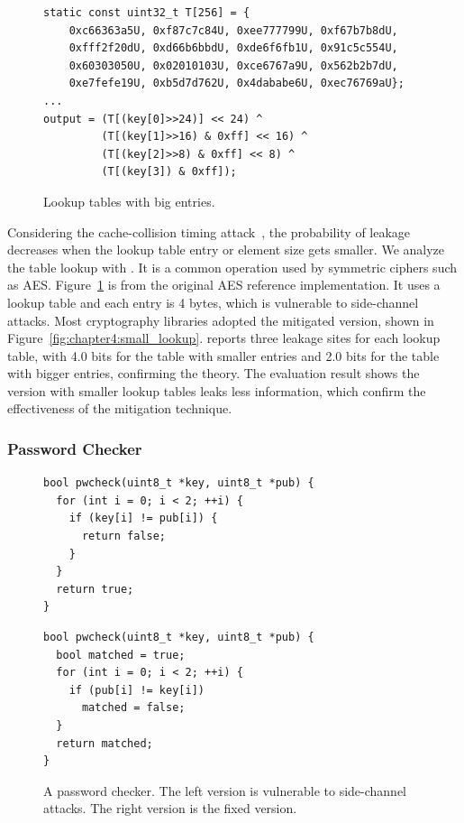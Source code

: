 \begin{figure}
\centering
    \begin{lstlisting}[xleftmargin=.1\textwidth, xrightmargin=.1\textwidth, frame=none]
static const uint32_t T[256] = {
    0xc66363a5U, 0xf87c7c84U, 0xee777799U, 0xf67b7b8dU,
    0xfff2f20dU, 0xd66b6bbdU, 0xde6f6fb1U, 0x91c5c554U,
    0x60303050U, 0x02010103U, 0xce6767a9U, 0x562b2b7dU,
    0xe7fefe19U, 0xb5d7d762U, 0x4dababe6U, 0xec76769aU};
...
output = (T[(key[0]>>24)] << 24) ^
         (T[(key[1]>>16) & 0xff] << 16) ^
         (T[(key[2]>>8) & 0xff] << 8) ^
         (T[(key[3]) & 0xff]);
\end{lstlisting}
  \caption{Lookup tables with big entries.}\label{fig:chapter4:big_lookup}
\end{figure}


Considering the cache-collision timing attack~\cite{Bonneau11894063_16}, the
probability of leakage decreases when the lookup table entry or element size gets
smaller. We analyze the table lookup with \tool{}. It is a common operation used by symmetric ciphers such as AES. Figure~\ref{fig:chapter4:big_lookup} is from the original AES reference implementation. It uses a lookup table and each entry is 4 bytes, which is vulnerable to side-channel attacks. Most cryptography libraries adopted the mitigated version, shown in Figure~\ref{fig:chapter4:small_lookup}. \tool{} reports three leakage sites for
each lookup table, with 4.0 bits for the table with smaller entries and 2.0
bits for the table with bigger entries, confirming the theory.
The evaluation result shows the version with smaller lookup tables leaks less information, which confirm the effectiveness of the mitigation technique. 



\subsubsection*{Password Checker}
\begin{figure}
  \begin{minipage}{0.45\linewidth}
    \begin{lstlisting}[xleftmargin=.0\textwidth, xrightmargin=.0\textwidth, frame=none]
bool pwcheck(uint8_t *key, uint8_t *pub) {
  for (int i = 0; i < 2; ++i) {
    if (key[i] != pub[i]) {
      return false;
    }
  }
  return true;
}
\end{lstlisting}
  \end{minipage}
  \hfill
  \begin{minipage}{0.45\linewidth}
    \begin{lstlisting}[xleftmargin=.0\textwidth, xrightmargin=.00\textwidth, frame=none]
bool pwcheck(uint8_t *key, uint8_t *pub) {
  bool matched = true;
  for (int i = 0; i < 2; ++i) {
    if (pub[i] != key[i]) 
      matched = false;
  }
  return matched;
}
\end{lstlisting}
  \end{minipage}
  \caption{A password checker. The left version is vulnerable to side-channel attacks. The right version is the fixed version.}\label{fig:chapter4:pwcheck}
\end{figure}

